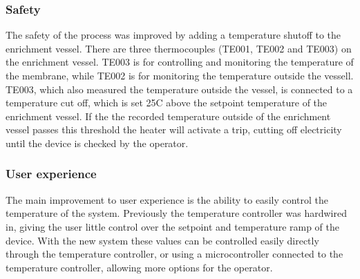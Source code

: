\subsubsection*{Safety}
The safety of the process was improved by adding a temperature shutoff to the enrichment vessel. There are three thermocouples (TE001, TE002 and TE003) on the enrichment vessel. TE003 is for controlling and monitoring the temperature of the membrane, while TE002 is for monitoring the temperature outside the vessell. TE003, which also measured the temperature outside the vessel, is connected to a temperature cut off, which is set 25\textdegree C above the setpoint temperature of the enrichment vessel. If the the recorded temperature outside of the enrichment vessel passes this threshold the heater will activate a trip, cutting off electricity until the device is checked by the operator. 

\subsubsection*{User experience}
The main improvement to user experience is the ability to easily control the temperature of the system. Previously the temperature controller was hardwired in, giving the user little control over the setpoint and temperature ramp of the device. With the new system these values can be controlled easily directly through the temperature controller, or using a microcontroller connected to the temperature controller, allowing more options for the operator.

